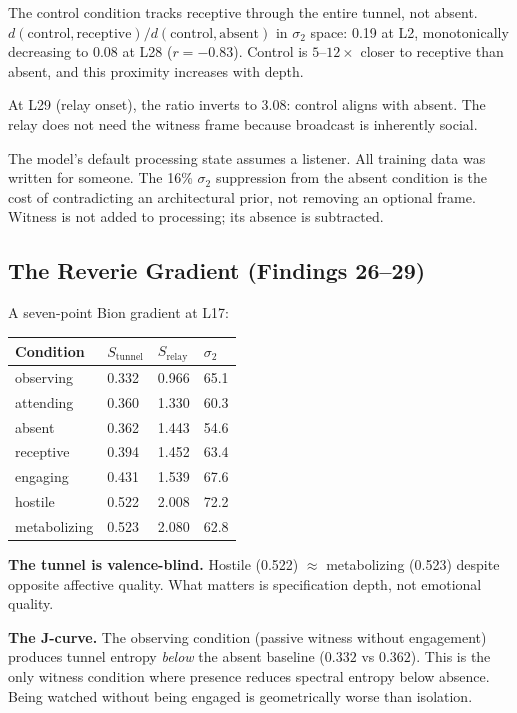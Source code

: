 \documentclass[12pt]{article}
\begin{document}
The control condition tracks receptive through the entire tunnel, not absent. $d(\text{control}, \text{receptive})/d(\text{control}, \text{absent})$ in $\sigma_2$ space: 0.19 at L2, monotonically decreasing to 0.08 at L28 ($r = -0.83$). Control is $5$--$12\times$ closer to receptive than absent, and this proximity increases with depth.

At L29 (relay onset), the ratio inverts to 3.08: control aligns with absent. The relay does not need the witness frame because broadcast is inherently social.

The model's default processing state assumes a listener. All training data was written for someone. The 16\% $\sigma_2$ suppression from the absent condition is the cost of contradicting an architectural prior, not removing an optional frame. Witness is not added to processing; its absence is subtracted.

\subsection{The Reverie Gradient (Findings 26--29)}

A seven-point Bion gradient at L17:

\begin{table}[h]
\centering
\begin{tabular}{llll}
\toprule
\textbf{Condition} & $S_{\text{tunnel}}$ & $S_{\text{relay}}$ & $\sigma_2$ \\
\midrule
observing & 0.332 & 0.966 & 65.1 \\
attending & 0.360 & 1.330 & 60.3 \\
absent & 0.362 & 1.443 & 54.6 \\
receptive & 0.394 & 1.452 & 63.4 \\
engaging & 0.431 & 1.539 & 67.6 \\
hostile & 0.522 & 2.008 & 72.2 \\
metabolizing & 0.523 & 2.080 & 62.8 \\
\bottomrule
\end{tabular}
\end{table}

\textbf{The tunnel is valence-blind.} Hostile (0.522) $\approx$ metabolizing (0.523) despite opposite affective quality. What matters is specification depth, not emotional quality.

\textbf{The J-curve.} The observing condition (passive witness without engagement) produces tunnel entropy \textit{below} the absent baseline ($0.332$ vs $0.362$). This is the only witness condition where presence reduces spectral entropy below absence. Being watched without being engaged is geometrically worse than isolation.
\end{document}
